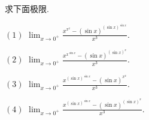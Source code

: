 \begin{exercise}{}
求下面极限.

$(1)$ ${\displaystyle \lim_{x\to0^{+}}\frac{x^{x^{x}}-(\sin x)^{(\sin x)^{\sin x}}}{x^{3}}.}$

$(2)$ ${\displaystyle \lim_{x\to0^{+}}\frac{x^{x^{\sin x}}-(\sin x)^{(\sin x)^{x}}}{x^{3}}.}$

$(3)$ ${\displaystyle \lim_{x\to0^{+}}\frac{x^{(\sin x)^{\sin x}}-(\sin x)^{x^{x}}}{x^{3}}.}$

$(4)$ ${\displaystyle \lim_{x\to0^{+}}\frac{x^{(\sin x)^{\sin x}}-(\sin x)^{(\sin x)^{x}}}{x^{3}}.}$

\end{exercise}